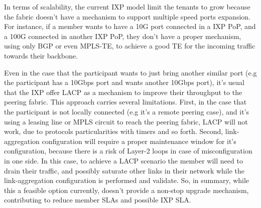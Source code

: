 \documentclass[12pt]{article}
\begin{document}

In terms of scalability, the current IXP model limit the tenants to grow because the fabric doesn't have a mechanism to support multiple speed ports expansion. For instance, if a member wants to have a 10G port connected in a IXP PoP, and a 100G connected in another IXP PoP, they don't have a proper mechanism, using only BGP or even MPLS-TE, to achieve a good TE for the incoming traffic towards their backbone.


Even in the case that the participant wants to just bring another similar port (e.g the participant has a 10Gbps port and wants another 10Gbps port), it's usual that the IXP offer LACP as a mechanism to improve their throughput to the peering fabric. This approach carries several limitations. First, in the case that the participant is not locally connected (e.g it's a remote peering case), and it's using a leasing line or MPLS circuit to reach the peering fabric, LACP will not work, due to protocols particularities with timers and so forth. Second, link-aggregation configuration will require a proper maintenance window for it's configuration, because there is a risk of Layer-2 loops in case of misconfiguration in one side. In this case, to achieve a LACP scenario the member will need to drain their traffic, and possibly saturate other links in their network while the link-aggregation configuration is performed and validate. So, in summary, while this a feasible option currently, doesn't provide a non-stop upgrade mechanism, contributing to reduce member SLAs and possible IXP SLA.
\end{document}
